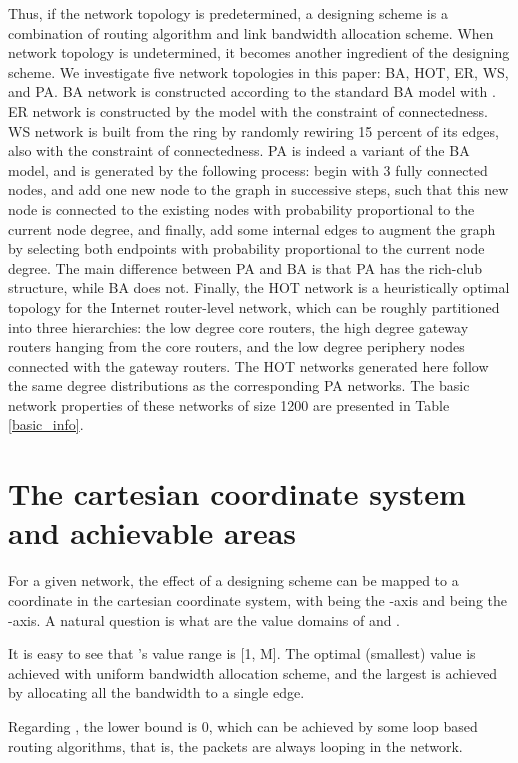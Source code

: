 \documentclass[journal]{IEEEtran}
\begin{document}
{Thus, if the network topology is predetermined, a designing scheme
is a combination of routing algorithm and link bandwidth allocation
scheme. When network topology is undetermined, it becomes another
ingredient of the designing scheme. We investigate five network
topologies in this paper: BA\cite{BA}, HOT\cite{HOT},
ER\cite{erdos59}, WS\cite{small-world1998}, and PA.  BA network is
constructed according to the standard BA model with . ER
network is constructed by the  model with the constraint of
connectedness. WS network is built from the ring by randomly
rewiring 15 percent of its edges, also with the constraint of
connectedness. PA is indeed a variant of the BA model, and is
generated by the following process: begin with 3 fully connected
nodes, and add one new node to the graph in successive steps, such
that this new node is connected to the existing nodes with
probability proportional to the current node degree, and finally,
add some internal edges to augment the graph by selecting both
endpoints with probability proportional to the current node degree.
The main difference between PA and BA is that PA has the rich-club
structure\cite{rich-club}, while BA does not.  Finally, the HOT
network is a heuristically optimal topology for the Internet
router-level network, which can be roughly partitioned into three
hierarchies: the low degree core routers, the high degree gateway
routers hanging from the core routers, and the low degree periphery
nodes connected with the gateway routers. The HOT networks generated
here follow the same degree distributions as the corresponding PA
networks.  The basic network properties of these networks of size
1200 are presented in Table \ref{basic_info}.


\section{The cartesian coordinate system and achievable
areas}\label{coordinate-system}
 For a given network, the effect of a
designing scheme can be mapped to a coordinate in the cartesian
coordinate system, with  being the -axis and  being
the -axis. A natural question is what are the value domains of
 and .

It is easy to see that 's value range is [1, M]. The
optimal (smallest) value is achieved with uniform bandwidth
allocation scheme, and the largest is achieved by allocating all the
bandwidth to a single edge.

Regarding , the lower bound is 0, which can be achieved by some
loop based routing algorithms, that is, the packets are always
looping in the network.

}
\end{document}
